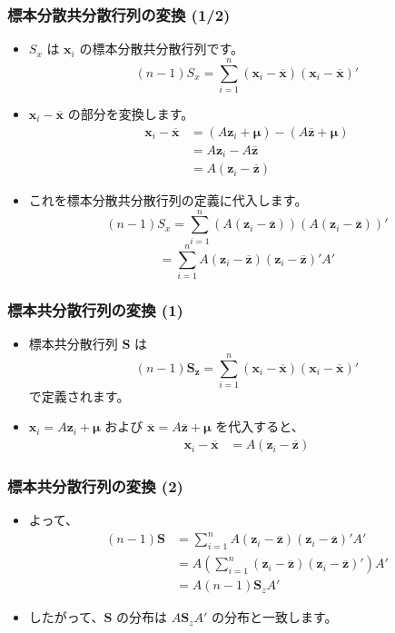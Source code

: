 \documentclass{beamer}
\begin{document}
\begin{frame}
\frametitle{標本分散共分散行列の変換 (1/2)}
\begin{itemize}
    \item $S_x$ は $\bm{x}_i$ の標本分散共分散行列です。
    \[
    (n-1)S_x = \sum_{i=1}^{n} (\bm{x}_i - \overline{\bm{x}})(\bm{x}_i - \overline{\bm{x}})'
    \]
    \item $\bm{x}_i - \overline{\bm{x}}$ の部分を変換します。
    \begin{align*}
        \bm{x}_i - \overline{\bm{x}} &= (A\bm{z}_i + \bm{\mu}) - (A\overline{\bm{z}} + \bm{\mu}) \\
        &= A\bm{z}_i - A\overline{\bm{z}} \\
        &= A(\bm{z}_i - \overline{\bm{z}})
    \end{align*}
    \item これを標本分散共分散行列の定義に代入します。
    \[
    (n-1)S_x = \sum_{i=1}^{n} (A(\bm{z}_i - \overline{\bm{z}}))(A(\bm{z}_i - \overline{\bm{z}}))'
    \]
    \[
    = \sum_{i=1}^{n} A(\bm{z}_i - \overline{\bm{z}})(\bm{z}_i - \overline{\bm{z}})'A'
    \]
\end{itemize}
\end{frame}

\begin{frame}
\frametitle{標本共分散行列の変換 (1)}
\begin{itemize}
    \item 標本共分散行列 $\bm{S}$ は
    \[
    (n-1)\bm{S_z} = \sum_{i=1}^{n} (\bm{x}_i - \overline{\bm{x}})(\bm{x}_i - \overline{\bm{x}})'
    \]
    で定義されます。
    \item $\bm{x}_i = A\bm{z}_i + \bm{\mu}$ および $\overline{\bm{x}} = A\overline{\bm{z}} + \bm{\mu}$ を代入すると、
    \begin{align*}
    \bm{x}_i - \overline{\bm{x}} &= A(\bm{z}_i - \overline{\bm{z}})
    \end{align*}
\end{itemize}
\end{frame}

\begin{frame}
\frametitle{標本共分散行列の変換 (2)}
\begin{itemize}
    \item よって、
    \begin{align*}
    (n-1)\bm{S} &= \sum_{i=1}^{n} A(\bm{z}_i - \overline{\bm{z}})(\bm{z}_i - \overline{\bm{z}})'A' \\
    &= A \left( \sum_{i=1}^{n} (\bm{z}_i - \overline{\bm{z}})(\bm{z}_i - \overline{\bm{z}})' \right) A' \\
    &= A (n-1)\bm{S}_z A'
    \end{align*}
    \item したがって、$\bm{S}$ の分布は $A\bm{S}_zA'$ の分布と一致します。
\end{itemize}
\end{frame}
\end{document}
